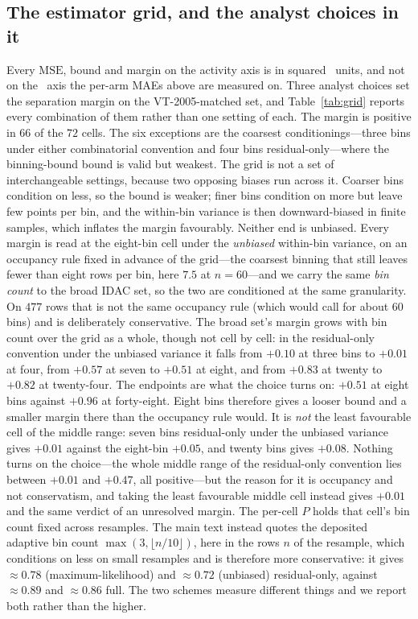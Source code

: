 \subsection{The estimator grid, and the analyst choices in it}
\label{sec:si-grid}
Every $\mathrm{MSE}$, bound and margin on the activity axis is in
squared \lngi\ units, and not on the \lnx\ axis the per-arm MAEs above are measured on.
Three analyst choices set the separation margin on the VT-2005-matched set, and
Table~\ref{tab:grid} reports every combination of them rather than one setting of each. The margin is
positive in $66$ of the $72$ cells. The six exceptions are the coarsest conditionings---three bins
under either combinatorial convention and four bins residual-only---where the binning-bound
bound is valid but weakest. The grid is not a set of interchangeable settings, because two opposing
biases run across it. Coarser bins condition on less, so the bound is weaker; finer bins condition on
more but leave few points per bin, and the within-bin variance is then downward-biased in finite
samples, which inflates the margin favourably. Neither end is unbiased. Every margin is read at the
eight-bin cell under
the \emph{unbiased} within-bin variance, on an occupancy rule fixed in advance of the grid---the
coarsest binning that still leaves fewer than eight rows per bin, here $7.5$ at $n{=}60$---and we
carry the same \emph{bin count} to the broad IDAC set, so the two are conditioned at the same
granularity. On $477$ rows that is not the same occupancy rule (which would call for about $60$ bins)
and is deliberately conservative. The broad set's margin grows with bin count over the grid as a
whole, though not cell by cell: in the residual-only convention under the unbiased variance it falls from
$+0.10$ at three bins to $+0.01$ at four, from $+0.57$ at seven to $+0.51$ at eight, and from $+0.83$
at twenty to $+0.82$ at twenty-four. The endpoints are what the choice turns on: $+0.51$ at
eight bins against $+0.96$ at forty-eight. Eight bins therefore gives a looser bound and a smaller
margin there than the occupancy rule would. It is \emph{not} the least favourable cell of the
middle range: seven bins residual-only under the
unbiased variance gives $+0.01$ against the eight-bin $+0.05$, and twenty bins gives $+0.08$. Nothing
turns on the choice---the whole middle range of the residual-only convention lies between $+0.01$ and
$+0.47$, all positive---but the reason for it is occupancy and not conservatism, and taking the least
favourable middle cell instead gives $+0.01$ and the same verdict of an
unresolved margin. The per-cell $P$ holds that cell's bin count fixed across
resamples. The main text instead quotes the deposited adaptive bin count
$\max(3,\lfloor n/10\rfloor)$, here in the rows $n$ of the resample, which conditions on less on
small resamples and is
therefore more conservative: it gives ${\approx}0.78$ (maximum-likelihood) and ${\approx}0.72$
(unbiased) residual-only, against ${\approx}0.89$ and ${\approx}0.86$ full. The two schemes measure
different things and we report both rather than the higher.

